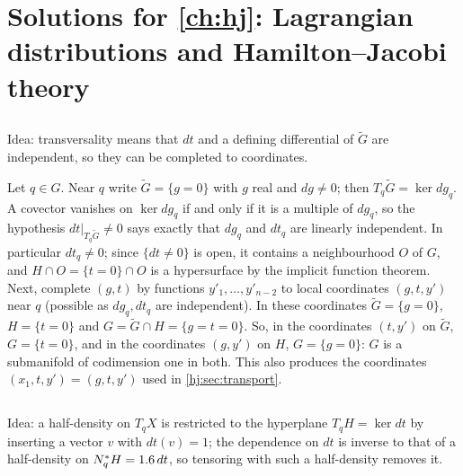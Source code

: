 \providecommand{\osc}[1]{\mathcal{I}[#1]}

\section{Solutions for \cref{ch:hj}: Lagrangian distributions and Hamilton--Jacobi theory}\label{solutions:hj}

\subsection*{}
Idea: transversality means that $dt$ and a defining differential of $\tilde G$ are
independent, so they can be completed to coordinates.

Let $q\in G$. Near $q$ write $\tilde G=\{g=0\}$ with $g$ real and $dg\ne0$; then
$T_q\tilde G=\ker dg_q$. A covector vanishes on $\ker dg_q$ if and only if it is a multiple
of $dg_q$, so the hypothesis $dt|_{T_q\tilde G}\ne0$ says exactly that $dg_q$ and $dt_q$ are
linearly independent. In particular $dt_q\ne0$; since $\{dt\ne0\}$ is open, it contains a
neighbourhood $O$ of $G$, and $H\cap O=\{t=0\}\cap O$ is a hypersurface by the implicit
function theorem. Next, complete $(g,t)$ by functions $y'_1,\dots,y'_{n-2}$ to local
coordinates $(g,t,y')$ near $q$ (possible as $dg_q,dt_q$ are independent). In these
coordinates $\tilde G=\{g=0\}$, $H=\{t=0\}$ and $G=\tilde G\cap H=\{g=t=0\}$. So, in the
coordinates $(t,y')$ on $\tilde G$, $G=\{t=0\}$, and in the coordinates $(g,y')$ on $H$,
$G=\{g=0\}$: $G$ is a submanifold of codimension one in both. This also produces the
coordinates $(x_1,t,y')=(g,t,y')$ used in \cref{hj:sec:transport}.

\subsection*{}
Idea: a half-density on $T_qX$ is restricted to the hyperplane $T_qH=\ker dt$ by inserting a
vector $v$ with $dt(v)=1$; the dependence on $dt$ is inverse to that of a half-density on
$N^*_qH=1.6\,dt$, so tensoring with such a half-density removes it.

